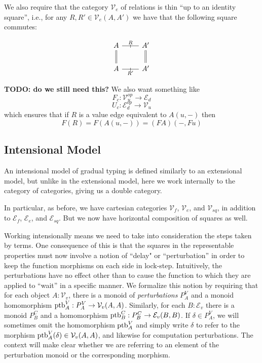 We also require that the category $\mathcal V_e$ of relations is thin ``up to an
identity square'', i.e., for any $R, R' \in \mathcal V_e(A, A')$ we have that the
following square commutes:

\[\begin{tikzcd}[ampersand replacement=\&]
  A \& {A'} \\
  A \& {A'}
  \arrow[from=1-1, to=2-1, Rightarrow, no head]
  \arrow[from=1-2, to=2-2, Rightarrow, no head]
  \arrow["R", "\shortmid"{marking}, no head, from=1-1, to=1-2]
  \arrow["R'"', "\shortmid"{marking}, no head, from=2-1, to=2-2]
\end{tikzcd}\]


\textbf{TODO: do we still need this?}
We also want something like
\[ F_c : \mathcal V_u^{op} \to \mathcal E_d \]
\[ U_c : \mathcal E_d^{op} \to \mathcal V_u \]
which ensures that if $R$ is a value edge equivalent to $A(u,-)$ then
\[ F(R) = F(A(u,-)) = (F A)(-,F u) \]


\subsection{Intensional Model}

An intensional model of gradual typing is defined similarly to an extensional model,
but unlike in the extensional model, here we work internally to the category of
categories, giving us a double category.

In particular, as before, we have cartesian categories $\mathcal V_f$,
$\mathcal V_e$, and $\mathcal V_{sq}$, in addition to $\mathcal E_f$,
$\mathcal E_e$, and $\mathcal E_{sq}$.
But we now have horizontal composition of squares as well.

Working intensionally means we need to take into consideration the steps
taken by terms. One consequence of this is that the squares in the representable
properties must now involve a notion of ``delay" or ``perturbation'' in order to
keep the function morphisms on each side in lock-step. Intuitively, the perturbations
have no effect other than to cause the function to which they are applied to ``wait''
in a specific manner.
We formalize this notion by requiring that for each object $A : \mathcal V_v$,
there is a monoid of \emph{perturbations} $P^V_A$  and a monoid homomorphism
$\text{ptb}^V_A : P^V_A \to \mathcal V_v(A,A)$.
Similarly, for each $B : \mathcal E_v$ there is a monoid $P^C_B$ and a
homomorphism $\text{ptb}^C_B : P^C_B \to \mathcal E_v(B,B)$.
If $\delta \in P^V_A$, we will sometimes omit the homomorphism $\text{ptb}^V_A$ and simply write
$\delta$ to refer to the morphism $\text{ptb}^V_A(\delta) \in \mathcal V_v(A,A)$, and likewise
for computation perturbations. The context will make clear whether we are referring
to an element of the perturbation monoid or the corresponding morphism.


